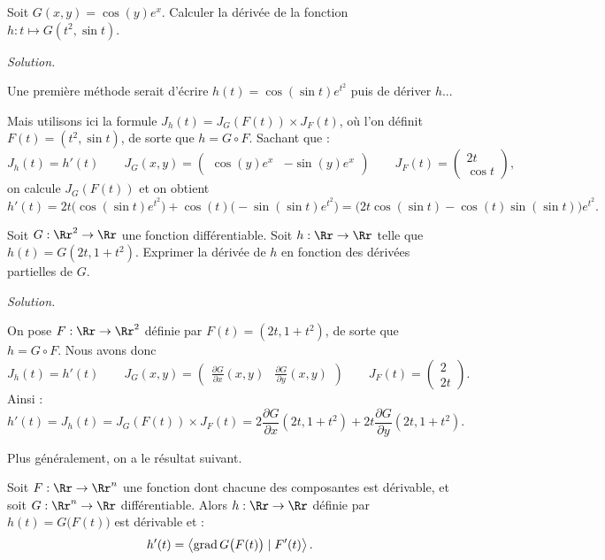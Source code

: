 \documentclass[11pt, class=report,crop=false]{standalone}
\begin{document}
\begin{exemple}
Soit $G(x,y)=\cos(y) e^{x}$. Calculer la dérivée de la fonction $h :t \mapsto G(t^2,\sin t)$.

\bigskip
\emph{Solution.}

Une première méthode serait d'écrire $h(t) = \cos(\sin t) e^{t^2}$ puis de dériver $h$...

Mais utilisons ici la formule
$J_h (t) = J_G ( F(t) ) \times J_F (t)$, où l'on définit $F(t) = (t^2,\sin t)$, de sorte que $h = G \circ F$.
Sachant que :
$$J_h(t) = h'(t) \qquad
J_G(x,y) = \begin{pmatrix} \cos(y) e^{x} & -\sin(y) e^{x}\end{pmatrix} \qquad
J_F (t) = \begin{pmatrix} 2t \\ \cos t \end{pmatrix},$$ 
on calcule $J_G( F(t) )$ et on obtient 
$$h'(t) =  2t \big( \cos (\sin t) e^{t^2}\big) +\cos(t)\big(-\sin (\sin t) e^{t^2} \big)
= \big(2t \cos (\sin t)-\cos(t) \sin (\sin t) \big)e^{t^2}.$$ 
\end{exemple}



\begin{exemple}
Soit $G : \Rr^2 \to \Rr$ une fonction différentiable. 
Soit $h : \Rr \to \Rr$ telle que $h(t)=G(2t,1+t^2)$.
Exprimer la dérivée de $h$ en fonction des dérivées partielles de $G$.


\bigskip
\emph{Solution.}

On pose $F: \Rr \to \Rr^2$ définie par $F(t) = (2t,1+t^2)$, de sorte que $h = G \circ F$.
Nous avons donc 
$$J_h(t) = h'(t) \qquad
J_G(x,y) = \begin{pmatrix} \frac{\partial G}{\partial x}(x,y)
&  \frac{\partial G}{\partial y}(x,y)  \end{pmatrix} \qquad
J_F (t) = \begin{pmatrix} 2 \\ 2t \end{pmatrix}.$$ 
Ainsi :
$$h'(t) = J_h (t) = J_G ( F(t) ) \times J_F (t) =
2\frac{\partial G}{\partial x}(2t,1+t^2)  +
2t\frac{\partial G}{\partial y}(2t,1+t^2).
$$
\end{exemple}


\bigskip


Plus généralement, on a le résultat suivant.
\begin{proposition}
Soit $F : \Rr \to \Rr^n$ une fonction dont chacune des composantes est dérivable, et soit $G : \Rr^n \to \Rr$ différentiable. Alors $h : \Rr \to \Rr$
définie par $h(t) = G\big( F(t) \big)$ est dérivable et :
$$h'(t) = \left\langle \operatorname{grad} G \big( F(t) \big) \mid F'(t) \right\rangle.$$
\end{proposition}
\end{document}
